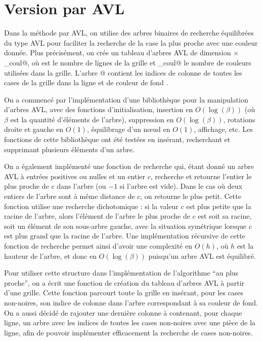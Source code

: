 \documentclass[a4paper,12pt]{article}
\numberwithin{equation}{section}
\begin{document}
\section{Version par AVL}

Dans la méthode par AVL, on utilise des arbres binaires de recherche équilibrées du type AVL pour faciliter la recherche de la case la plus proche avec une couleur donnée. Plus précisément, on crée un tableau \verb@M@ d'arbres AVL de dimension \verb@m@ $\times$ \verb@nb_coul@, où \verb@m@ est le nombre de lignes de la grille et \verb@nb_coul@ le nombre de couleurs utilisées dans la grille. L'arbre \verb@M[i][c]@ contient les indices de colonne \verb@j@ de toutes les cases de la grille dans la ligne \verb@i@ et de couleur de fond \verb@c@.

On a commencé par l'implémentation d'une bibliothèque pour la manipulation d'arbres AVL, avec des fonctions d'initialisation, insertion en $O(\log(\beta))$ (où $\beta$ est la quantité d'éléments de l'arbre), suppression en $O(\log(\beta))$, rotations droite et gauche en $O(1)$, équilibrage d'un n\oe{}ud en $O(1)$, affichage, etc. Les fonctions de cette bibliothèque ont été testées en insérant, recherchant et supprimant plusieurs éléments d'un arbre.

On a également implémenté une fonction de recherche qui, étant donné un arbre AVL à entrées positives ou nulles et un entier $c$, recherche et retourne l'entier le plus proche de $c$ dans l'arbre (ou $-1$ si l'arbre est vide). Dans le cas où deux entiers de l'arbre sont à même distance de $c$, on retourne le plus petit. Cette fonction utilise une recherche dichotomique : si la valeur $c$ est plus petite que la racine de l'arbre, alors l'élément de l'arbre le plus proche de $c$ est soit sa racine, soit un élément de son sous-arbre gauche, avec la situation symétrique lorsque $c$ est plus grand que la racine de l'arbre. Une implémentation récursive de cette fonction de recherche permet ainsi d'avoir une complexité en $O(h)$, où $h$ est la hauteur de l'arbre, et donc en $O(\log(\beta))$ puisqu'un arbre AVL est équilibré.

Pour utiliser cette structure dans l'implémentation de l'algorithme ``au plus proche'', on a écrit une fonction de création du tableau d'arbres AVL \verb@M@ à partir d'une grille. Cette fonction parcourt toute la grille en insérant, pour les cases non-noires, son indice de colonne dans l'arbre correspondant à sa couleur de fond. On a aussi décidé de rajouter une dernière colonne à \verb@M@ contenant, pour chaque ligne, un arbre avec les indices de toutes les cases non-noires avec une pièce de la ligne, afin de pouvoir implémenter efficacement la recherche de cases non-noires.
\end{document}
